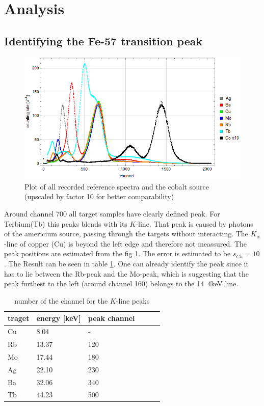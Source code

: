 \section{Analysis}
\subsection{Identifying the Fe-57 transition peak}
\begin{figure}[H]
\centering
\includegraphics[width=1\linewidth]{../results/calibration/spectra}
\caption[Reference spectra]{Plot of all recorded reference spectra and the cobalt source (upscaled by factor 10 for better comparability)}
\label{fig:analysis:spectra}
\end{figure}
Around channel 700 all target samples have clearly defined peak. For Terbium(Tb) this peaks blends with its $K$-line. That peak is caused by photons of the americium source, passing through the targets without interacting. The $K_\alpha$-line of copper (Cu) is beyond the left edge and therefore not meassured. The peak positions are estimated from the fig \ref{fig:analysis:spectra}. The error is estimated to be $s_{Ch}=10$. The Result can be seen in table \ref{tb:analysis:peakpos}. One can already identify the peak since it has to lie between the Rb-peak and the Mo-peak, which is suggesting that the peak furthest to the left (around channel 160) belongs to the \unit{14.4}{keV} line.

\begin{table}[H]\centering
	\begin{tabular}{@{}llllll@{}}
		\toprule
		 traget & energy [keV]& peak channel  \\
		\midrule
		Cu & 8.04 & - \\
		Rb & 13.37 & 120 \\
		Mo & 17.44 & 180 \\
		Ag & 22.10 & 230 \\
		Ba & 32.06 & 340 \\
		Tb & 44.23 & 500\\
		\bottomrule
	\end{tabular}
	\caption[peak positions]{number of the channel for the $K$-line peaks}
	\label{tb:analysis:peakpos}
\end{table}

